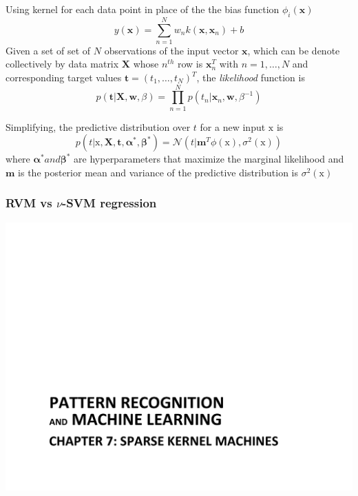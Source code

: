 \documentclass[t,14pt]{beamer}
\begin{document}
\begin{frame}
  \frametitle{}
  Using kernel for each data point in place of the the bias function 
  $\phi_i(\mathbf{x})$
  \begin{equation}
    y(\mathbf{x}) = \sum\limits_{n=1}^N w_n k(\mathbf{x}, \mathbf{x}_n) + b 
  \end{equation}
  Given a set of set of $N$ observations of the input vector $\mathbf{x}$, 
  which can be denote collectively by data matrix $\mathbf{X}$ whose $n^{th}$ 
  row is $\mathbf{x}_n^T$ with $n = 1, \ldots , N$ and corresponding target 
  values $\mathbf{t} = (t_1, \ldots, t_N)^T$, the \textit{likelihood} function 
  is
  \begin{equation}
    p(\mathbf{t}|\mathbf{X}, \mathbf{w}, \beta) 
        = \prod\limits_{n=1}^N p(t_n | \mathbf{x}_n, \mathbf{w}, \beta^{-1})
  \end{equation}
\end{frame}

\begin{frame}
  Simplifying, the predictive distribution over $t$ for a new input 
  $\mathrm{x}$ is 
  \begin{equation}
  p(t|\mathrm{x}, \mathbf{X}, \mathbf{t}, \mathbf{\alpha}^*, \mathbf{\beta}^*)
    = \mathcal{N}(t|\mathbf{m}^T \phi(\mathrm{x}), \sigma^2(\mathrm{x}))
  \end{equation}
  where $\mathbf{\alpha}^{*} and \mathbf{\beta}^{*}$ are hyperparameters that 
  maximize the marginal likelihood and \\
  $\mathbf{m}$ is the posterior mean and variance of the predictive 
  distribution is $\sigma^2(\mathrm{x})$
\end{frame}

\begin{frame}
  \frametitle{RVM vs $\nu$-SVM regression}
  \includegraphics[trim=2cm 0cm 0cm 5cm,clip,scale=0.5,page=11]{Chapter_7.pdf}
\end{frame}
\end{document}

